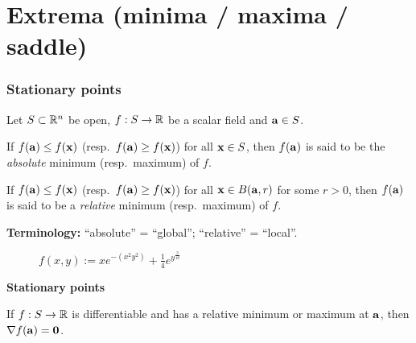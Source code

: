 \section{Extrema (minima / maxima / saddle)}

\subsubsection*{Stationary points}


Let \(S\subset \bR^n\) be open,
\(f:S \to \bR\) be a scalar field
and \(\aa \in S\).

\begin{definition}
    If \(f(\aa)\leq f(\xx)\) (resp.\ \(f(\aa)\geq f(\xx)\)) for all \(\xx \in S\), then \(f(\aa)\) is said to be the \emph{absolute} minimum (resp.\ maximum) of \(f\).
\end{definition}

\begin{definition}
    If \(f(\aa)\leq f(\xx)\) (resp.\ \(f(\aa)\geq f(\xx)\)) for all \(\xx \in B(\aa,r)\) for some \(r>0\), then \(f(\aa)\) is said to be a \emph{relative} minimum (resp.\ maximum) of \(f\).
\end{definition}


\textbf{Terminology:}
``absolute'' = ``global'';
``relative'' = ``local''.
\begin{figure}
    \centering
    \caption{$f(x,y) := x e^{-(x^2y^2)}  + \frac{1}{4}e^{y^\frac{3}{10}}$}
\end{figure}








\textbf{Stationary points}




\begin{theorem}
    If \(f:S\to\bR\) is differentiable and has a relative minimum or maximum at \(\aa\), then \(\nabla f(\aa)=  \mathbf{0}\).
\end{theorem}


